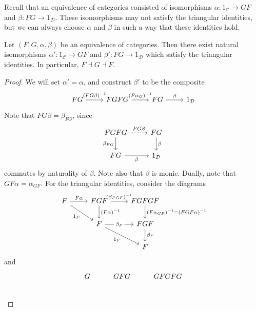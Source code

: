 Recall that an equivalence of categories consisted of isomorphisms \( \alpha : 1_{\mathcal C} \to GF \) and \( \beta : FG \to 1_{\mathcal D} \).
These isomorphisms may not satisfy the triangular identities, but we can always choose \( \alpha \) and \( \beta \) in such a way that these identities hold.
\begin{proposition}
    Let \( (F, G, \alpha, \beta) \) be an equivalence of categories.
    Then there exist natural isomorphisms \( \alpha' : 1_{\mathcal C} \to GF \) and \( \beta' : FG \to 1_{\mathcal D} \) which satisfy the triangular identities.
    In particular, \( F \dashv G \dashv F \).
\end{proposition}
\begin{proof}
    We will set \( \alpha' = \alpha \), and construct \( \beta' \) to be the composite
\[\begin{tikzcd}
	FG & FGFG & FG & {1_{\mathcal D}}
	\arrow["{(FG\beta)^{-1}}", from=1-1, to=1-2]
	\arrow["{(F\alpha_G)^{-1}}", from=1-2, to=1-3]
	\arrow["\beta", from=1-3, to=1-4]
\end{tikzcd}\]
    Note that \( FG\beta = \beta_{FG} \), since
\[\begin{tikzcd}
	FGFG & FG \\
	FG & {1_{\mathcal D}}
	\arrow["FG\beta", from=1-1, to=1-2]
	\arrow["\beta", from=1-2, to=2-2]
	\arrow["{\beta_{FG}}"', from=1-1, to=2-1]
	\arrow["\beta"', from=2-1, to=2-2]
\end{tikzcd}\]
    commutes by naturality of \( \beta \).
    Note also that \( \beta \) is monic.
    Dually, note that \( GF\alpha = \alpha_{GF} \).
    For the triangular identities, consider the diagrams
\[\begin{tikzcd}
	F & FGF & FGFGF \\
	& F & FGF \\
	&& F
	\arrow["{F\alpha}", from=1-1, to=1-2]
	\arrow["{(\beta_{FGF})^{-1}}", from=1-2, to=1-3]
	\arrow["{(F\alpha_{GF})^{-1} = (FGF \alpha)^{-1}}", from=1-3, to=2-3]
	\arrow["{\beta_F}", from=2-3, to=3-3]
	\arrow["{(F\alpha)^{-1}}", from=1-2, to=2-2]
	\arrow["{\beta_F}"{description}, from=2-2, to=2-3]
	\arrow["{1_F}"', from=1-1, to=2-2]
	\arrow["{1_F}"', from=2-2, to=3-3]
\end{tikzcd}\]
    and
\[\begin{tikzcd}
	G & GFG & GFGFG \\

\end{tikzcd}\]
\end{proof}
